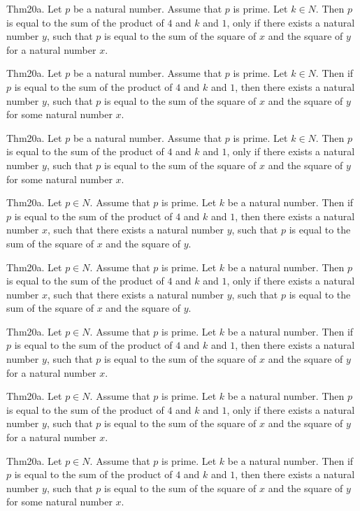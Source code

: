 \documentclass{article}
\begin{document}
Thm20a. Let $p$ be a natural number. Assume that $p$ is prime. Let $k \in N$. Then $p$ is equal to the sum of the product of $4$ and $k$ and $1$, only if there exists a natural number $y$, such that $p$ is equal to the sum of the square of $x$ and the square of $y$ for a natural number $x$.

Thm20a. Let $p$ be a natural number. Assume that $p$ is prime. Let $k \in N$. Then if $p$ is equal to the sum of the product of $4$ and $k$ and $1$, then there exists a natural number $y$, such that $p$ is equal to the sum of the square of $x$ and the square of $y$ for some natural number $x$.

Thm20a. Let $p$ be a natural number. Assume that $p$ is prime. Let $k \in N$. Then $p$ is equal to the sum of the product of $4$ and $k$ and $1$, only if there exists a natural number $y$, such that $p$ is equal to the sum of the square of $x$ and the square of $y$ for some natural number $x$.

Thm20a. Let $p \in N$. Assume that $p$ is prime. Let $k$ be a natural number. Then if $p$ is equal to the sum of the product of $4$ and $k$ and $1$, then there exists a natural number $x$, such that there exists a natural number $y$, such that $p$ is equal to the sum of the square of $x$ and the square of $y$.

Thm20a. Let $p \in N$. Assume that $p$ is prime. Let $k$ be a natural number. Then $p$ is equal to the sum of the product of $4$ and $k$ and $1$, only if there exists a natural number $x$, such that there exists a natural number $y$, such that $p$ is equal to the sum of the square of $x$ and the square of $y$.

Thm20a. Let $p \in N$. Assume that $p$ is prime. Let $k$ be a natural number. Then if $p$ is equal to the sum of the product of $4$ and $k$ and $1$, then there exists a natural number $y$, such that $p$ is equal to the sum of the square of $x$ and the square of $y$ for a natural number $x$.

Thm20a. Let $p \in N$. Assume that $p$ is prime. Let $k$ be a natural number. Then $p$ is equal to the sum of the product of $4$ and $k$ and $1$, only if there exists a natural number $y$, such that $p$ is equal to the sum of the square of $x$ and the square of $y$ for a natural number $x$.

Thm20a. Let $p \in N$. Assume that $p$ is prime. Let $k$ be a natural number. Then if $p$ is equal to the sum of the product of $4$ and $k$ and $1$, then there exists a natural number $y$, such that $p$ is equal to the sum of the square of $x$ and the square of $y$ for some natural number $x$.
\end{document}
